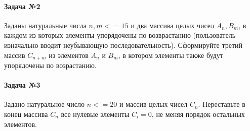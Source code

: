 \documentclass[12pt,a4paper]{report}
\begin{document}
\paragraph*{Задача №2}
Заданы натуральные числа $n, m <= 15$ и два массива целых чисел $A_n, B_m$, в каждом из которых элементы упорядочены по возврастанию (пользователь изначально вводит неубывающую последовательность). Сформируйте третий массив $C_{n+m}$ из элементов $A_n$ и $B_m$, в котором элементы также будут упорядочены по возрастанию.
\paragraph*{Задача №3}
Задано натуральное число $n <= 20$ и массив целых чисел $C_n$. Переставьте в конец массива $C_n$ все нулевые элементы $C_i = 0$, не меняя порядок остальных элементов.
\end{document}
